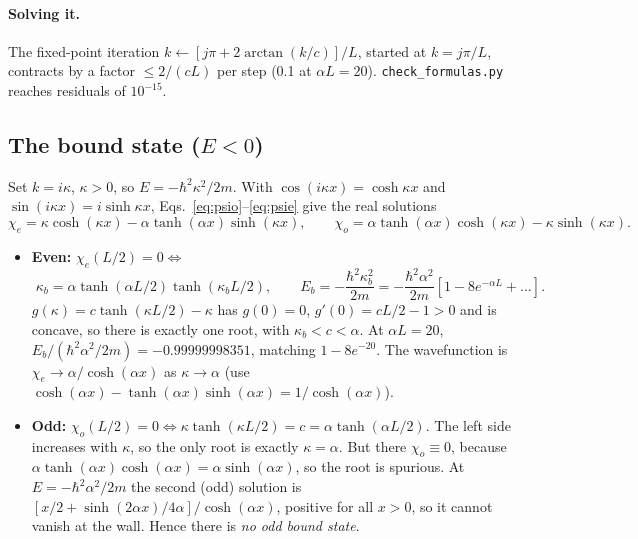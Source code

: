 \documentclass[11pt]{article}
\numberwithin{equation}{section}
\newcommand{\Eu}{\hbar^2\alpha^2/2m}
\begin{document}
\paragraph{Solving it.} The fixed-point iteration $k\leftarrow[j\pi+2\arctan(k/c)]/L$, started at $k=j\pi/L$, contracts by a factor $\le2/(cL)$ per step (0.1 at $\alpha L=20$). \texttt{check\_formulas.py} reaches residuals of $10^{-15}$.

\subsection{The bound state (\texorpdfstring{$E<0$}{E < 0})}
Set $k=i\kappa$, $\kappa>0$, so $E=-\hbar^2\kappa^2/2m$. With $\cos(i\kappa x)=\cosh\kappa x$ and $\sin(i\kappa x)=i\sinh\kappa x$, Eqs.~\eqref{eq:psio}--\eqref{eq:psie} give the real solutions
\begin{equation}
\chi_e=\kappa\cosh(\kappa x)-\alpha\tanh(\alpha x)\sinh(\kappa x),\qquad
\chi_o=\alpha\tanh(\alpha x)\cosh(\kappa x)-\kappa\sinh(\kappa x).
\end{equation}
\begin{itemize}[itemsep=2pt]
\item \textbf{Even:} $\chi_e(L/2)=0\iff$
\begin{equation}
\boxed{\;\kappa_b=\alpha\tanh(\alpha L/2)\tanh(\kappa_bL/2),\qquad E_b=-\frac{\hbar^2\kappa_b^2}{2m}=-\frac{\hbar^2\alpha^2}{2m}\left[1-8e^{-\alpha L}+\dots\right].\;}
\label{eq:bound}
\end{equation}
$g(\kappa)=c\tanh(\kappa L/2)-\kappa$ has $g(0)=0$, $g'(0)=cL/2-1>0$ and is concave, so there is exactly one root, with $\kappa_b<c<\alpha$. At $\alpha L=20$, $E_b/(\Eu)=-0.99999998351$, matching $1-8e^{-20}$. The wavefunction is $\chi_e\to\alpha/\cosh(\alpha x)$ as $\kappa\to\alpha$ (use $\cosh(\alpha x)-\tanh(\alpha x)\sinh(\alpha x)=1/\cosh(\alpha x)$).
\item \textbf{Odd:} $\chi_o(L/2)=0\iff\kappa\tanh(\kappa L/2)=c=\alpha\tanh(\alpha L/2)$. The left side increases with $\kappa$, so the only root is exactly $\kappa=\alpha$. But there $\chi_o\equiv0$, because $\alpha\tanh(\alpha x)\cosh(\alpha x)=\alpha\sinh(\alpha x)$, so the root is spurious. At $E=-\hbar^2\alpha^2/2m$ the second (odd) solution is $[x/2+\sinh(2\alpha x)/4\alpha]/\cosh(\alpha x)$, positive for all $x>0$, so it cannot vanish at the wall. Hence there is \emph{no odd bound state}.
\end{itemize}
\end{document}
